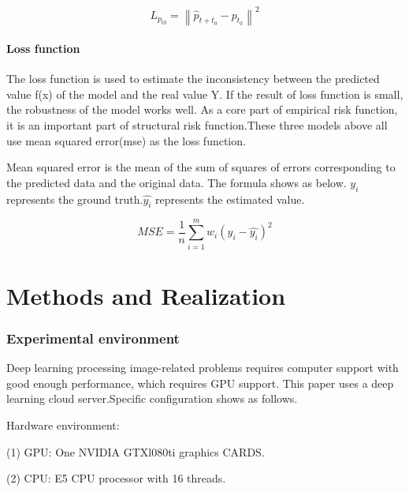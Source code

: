 \begin{equation}
	L_{ p_{t0}}=\left \| \hat{p}_{t+t_{0}}- p_{t_{0}} \right \|  ^{2}
\end{equation}




\subsubsection{Loss function}

The loss function is used to estimate the inconsistency between the predicted value f(x) of the model and the real value Y.\cite{zhu2014novel}
If the result of  loss function is small, the robustness of the model works well. As a core part of empirical risk function, it is an important part of structural risk function.These three models above all use mean squared error(mse) as the loss function.

Mean squared error is the mean of the sum of squares of errors corresponding to the predicted data and the original data. The formula shows as below. $y_{i}$ represents the ground truth.$\hat{y_{i}}$ represents the estimated value.

\begin{equation}
	MSE=\frac{1}{n}\sum_{i=1}^{m}w_{i}(y_{i}-\hat{y_{i}})^2
\end{equation}





\chapter{Methods and Realization}

\subsection{Experimental environment}

Deep learning processing image-related problems requires computer support with good enough performance, which requires GPU support. This paper uses a deep learning cloud server.Specific configuration shows as follows. 

Hardware environment:

(1) GPU: One NVIDIA GTXl080ti graphics CARDS.

(2) CPU: E5 CPU processor with 16 threads. 


